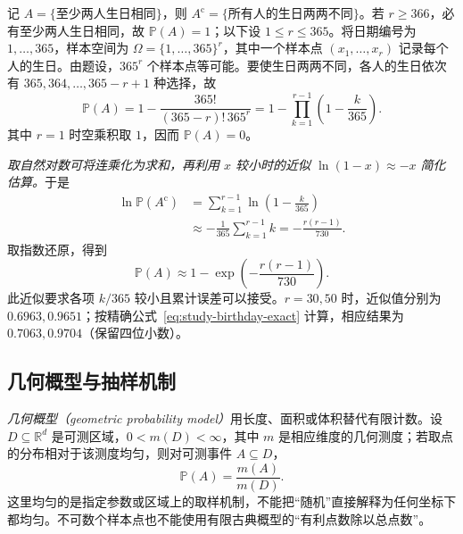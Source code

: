 \begin{solve}
记 $A=\{\text{至少两人生日相同}\}$，则 $A^{\mathrm c}=\{\text{所有人的生日两两不同}\}$。若 $r\ge366$，必有至少两人生日相同，故 $\mathbb P(A)=1$；以下设 $1\le r\le365$。将日期编号为 $1,\ldots,365$，样本空间为 $\Omega=\{1,\ldots,365\}^{r}$，其中一个样本点 $(x_1,\ldots,x_r)$ 记录每个人的生日。由题设，$365^r$ 个样本点等可能。要使生日两两不同，各人的生日依次有 $365,364,\ldots,365-r+1$ 种选择，故
\begin{equation}
  \mathbb P(A)=1-\frac{365!}{(365-r)!\,365^r}
  =1-\prod_{k=1}^{r-1}\left(1-\frac{k}{365}\right).
  \label{eq:study-birthday-exact}
\end{equation}
其中 $r=1$ 时空乘积取 $1$，因而 $\mathbb P(A)=0$。

\emph{取自然对数可将连乘化为求和，再利用 $x$ 较小时的近似 $\ln(1-x)\approx-x$ 简化估算。}于是
\begin{equation}
  \begin{aligned}
    \ln\mathbb P(A^{\mathrm c})
      &=\sum_{k=1}^{r-1}\ln\left(1-\frac{k}{365}\right)\\
      &\approx-\frac1{365}\sum_{k=1}^{r-1}k
      =-\frac{r(r-1)}{730}.
  \end{aligned}
  \label{eq:study-birthday-log}
\end{equation}
取指数还原，得到
\begin{equation}
  \mathbb P(A)\approx1-\exp\left(-\frac{r(r-1)}{730}\right).
  \label{eq:study-birthday-approx}
\end{equation}
此近似要求各项 $k/365$ 较小且累计误差可以接受。$r=30,50$ 时，近似值分别为 $0.6963,0.9651$；按精确公式~\eqref{eq:study-birthday-exact} 计算，相应结果为 $0.7063,0.9704$（保留四位小数）。
\end{solve}

\subsection{几何概型与抽样机制}
\label{subsec:study-geometric-probability}

\emph{几何概型（geometric probability model）}用长度、面积或体积替代有限计数。设 $D\subseteq\mathbb R^d$ 是可测区域，$0<m(D)<\infty$，其中 $m$ 是相应维度的几何测度；若取点的分布相对于该测度均匀，则对可测事件 $A\subseteq D$，
\begin{equation}
 \mathbb P(A)=\frac{m(A)}{m(D)}.
 \label{eq:study-geometric-probability}
\end{equation}
这里均匀的是指定参数或区域上的取样机制，不能把“随机”直接解释为任何坐标下都均匀。不可数个样本点也不能使用有限古典概型的“有利点数除以总点数”。

